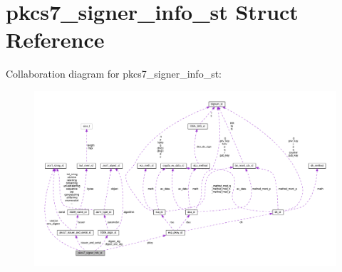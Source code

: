 \hypertarget{structpkcs7__signer__info__st}{}\section{pkcs7\+\_\+signer\+\_\+info\+\_\+st Struct Reference}
\label{structpkcs7__signer__info__st}


Collaboration diagram for pkcs7\+\_\+signer\+\_\+info\+\_\+st\+:
\nopagebreak
\begin{figure}[H]
\begin{center}
\leavevmode
\includegraphics[width=350pt]{structpkcs7__signer__info__st__coll__graph}
\end{center}
\end{figure}
